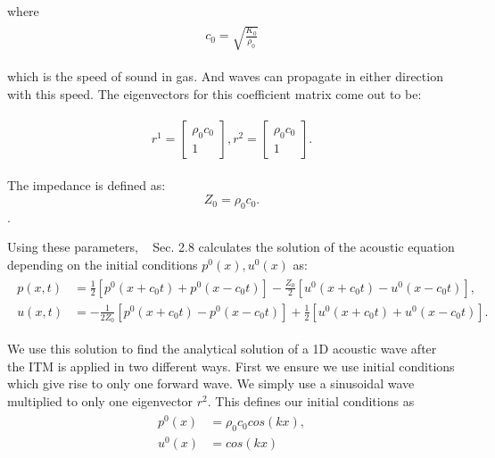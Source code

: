 where 
\begin{align}
    \begin{split}
        c_0 = \sqrt{\frac{K_0}{\rho_0}}
    \end{split}
\end{align}

which is the speed of sound in gas. And waves can propagate in either direction with this speed. The eigenvectors for this coefficient matrix come out to be:

\begin{align}
    \begin{split}
        r^1 = \begin{bmatrix}
            \rho_0 c_0 \\
            1
        \end{bmatrix}, 
        r^2 = \begin{bmatrix}
            \rho_0 c_0 \\
            1
        \end{bmatrix}.
    \end{split}
\end{align}

The impedance is defined as:
\begin{equation}
    Z_0 = \rho_0 c_0.
\end{equation}.

Using these parameters, ~\parencite{leveque_2002} Sec. 2.8 calculates the solution of the acoustic equation depending on the initial conditions $p^0(x), u^0(x)$ as:
\begin{align}
    \begin{split}
        p(x,t) &= \frac{1}{2}\left[p^0\left(x + c_0t\right) + p^0\left(x - c_0t\right)\right] - \frac{Z_0}{2}\left[u^0\left(x+c_0t\right) - u^0\left(x-c_0t\right)\right], \\
        u(x,t) &= -\frac{1}{2Z_0}\left[p^0\left(x+c_0t\right) - p^0\left(x-c_0t\right)\right] + \frac{1}{2}\left[u^0\left(x+c_0t\right) + u^0\left(x-c_0t\right)\right] .
    \end{split}
    \label{eq:solutionacoustic}
\end{align}

We use this solution to find the analytical solution of a 1D acoustic wave after the \ac{ITM} is applied in two different ways. First we ensure we use initial conditions which give rise to only one forward wave. We simply use a sinusoidal wave multiplied to only one eigenvector $r^2$.
This defines our initial conditions as
\begin{align}
    \begin{split}
        p^0\left(x\right) &= \rho_0c_0cos\left(kx\right), \\
        u^0\left(x\right) &= cos\left(kx\right)
    \end{split}
    \label{eq:initialconditions}
\end{align}

